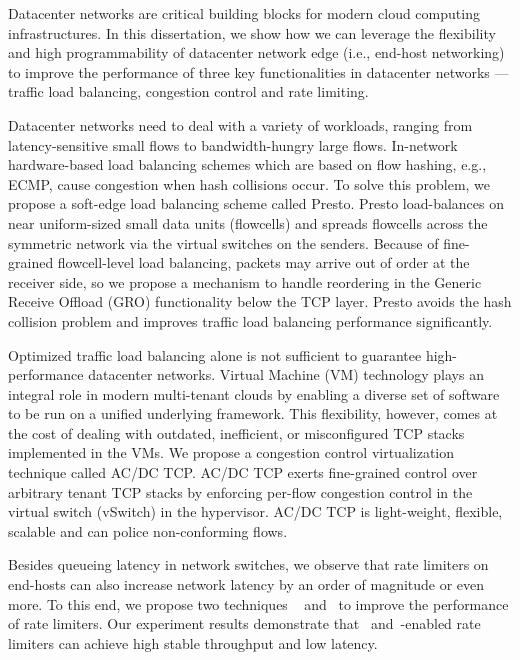 
\vcinfo{}


Datacenter networks are critical building blocks for modern cloud computing 
infrastructures. 
In this dissertation, we show how we can leverage 
the flexibility and high programmability of datacenter network edge 
(i.e., end-host networking)~\cite{ovs-extending,pfaff2015design} to 
improve the performance of three key functionalities in datacenter networks --- traffic load balancing, 
congestion control and rate limiting.

Datacenter networks need to deal with a variety of workloads, ranging
from latency-sensitive small flows to bandwidth-hungry
large flows. In-network hardware-based load balancing schemes which are based on flow hashing,
e.g., ECMP, cause congestion when hash collisions occur. 
To solve this problem, we propose a soft-edge load balancing scheme called Presto.
Presto load-balances on near uniform-sized small data units (flowcells) and 
spreads flowcells across the symmetric network via the virtual switches on the senders.
Because of fine-grained flowcell-level load balancing, packets may arrive out of order
at the receiver side, so we propose a mechanism to handle reordering in the 
Generic Receive Offload (GRO) functionality below the TCP layer.
Presto avoids the hash collision problem and improves traffic load balancing performance significantly.

Optimized traffic load balancing alone is not sufficient to 
guarantee high-performance datacenter networks. 
Virtual Machine (VM) technology plays an integral role in
modern multi-tenant clouds by enabling a diverse set of software to be run
on a unified underlying framework. This flexibility, however,
comes at the cost of dealing with outdated, inefficient,
or misconfigured TCP stacks implemented in the VMs. 
We propose a congestion control virtualization technique called AC/DC TCP.
AC/DC TCP exerts fine-grained control over arbitrary tenant
TCP stacks by enforcing per-flow congestion control in
the virtual switch (vSwitch) in the hypervisor. AC/DC TCP is light-weight,
flexible, scalable and can police non-conforming flows. 

Besides queueing latency in network switches, we observe that 
rate limiters on end-hosts can also increase network latency by an order of magnitude or even more. 
To this end, we propose two techniques \textemdash\xspace~\dem{} and~\spring{} to 
improve the performance of rate limiters.
Our experiment results demonstrate that~\dem{} and~\spring{}-enabled
rate limiters can achieve high stable throughput and low latency.


